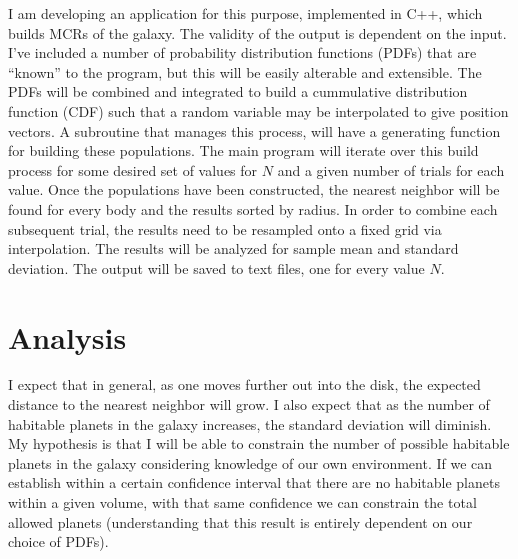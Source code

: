 \documentclass[10pt,a4paper,final]{article}
\begin{document}
		I am developing an application for this purpose, implemented in C++, which builds
		MCRs of the galaxy. The validity of the output is dependent on the input. I've
		included a number of probability distribution functions (PDFs) that are ``known''
		to the program, but this will be easily alterable and extensible. The PDFs
		will be combined and integrated to build a cummulative distribution function (CDF)
		such that a random variable may be interpolated to give position vectors. A subroutine
		that manages this process, will have a generating function for building these
		populations. The main program will iterate over this build process for some desired
		set of values for $N$ and a given number of trials for each value. Once the
		populations have been constructed, the nearest neighbor will be found for every
		body and the results sorted by radius. In order to combine each subsequent trial,
		the results need to be resampled onto a fixed grid via interpolation. The
		results will be analyzed for sample mean and standard deviation. The output
		will be saved to text files, one for every value $N$.
	
	\section{Analysis}	
	
		I expect that in general, as one moves further out into the disk, the expected
		distance to the nearest neighbor will grow. I also expect that as the number
		of habitable planets in the galaxy increases, the standard deviation will
		diminish. My hypothesis is that I will be able to constrain the number of
		possible habitable planets in the galaxy considering knowledge of our own
		environment. If we can establish within a certain confidence interval that there
		are no habitable planets within a given volume, with that same confidence
		we can constrain the total allowed planets (understanding that this result
		is entirely dependent on our choice of PDFs).
		
\end{document}

